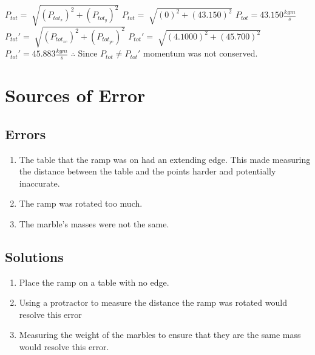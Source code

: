 \documentclass{article}
\begin{document}
$P_{tot} = \sqrt[]{{(P_{tot_{x}})}^{2} + {(P_{tot_{y}})}^{2}}$
\newline\newline
$P_{tot} = \sqrt[]{{(0)}^{2} + {(43.150)}^{2}}$
\newline\newline
$P_{tot} = 43.150\frac{kgm}{s}$
\newline\newline\newline
$P_{tot}\prime = \sqrt[]{{(P_{tot_{xc}})}^{2} + {(P_{tot_{yc}})}^{2}}$
\newline\newline
$P_{tot}\prime = \sqrt[]{{(4.1000)}^{2} + {(45.700)}^{2}}$
\newline\newline
$P_{tot}\prime = 45.883\frac{kgm}{s}$
\newline\newline\newline
$\therefore$ Since $P_{tot} \neq P_{tot}\prime$ momentum was not conserved.
\newline

\section*{Sources of Error}
\subsection*{Errors}
\begin{enumerate}
    \item {The table that the ramp was on had an extending edge. This made measuring the distance between the table and the points harder and potentially inaccurate.}
    \item {The ramp was rotated too much.}
    \item {The marble's masses were not the same.}
\end{enumerate}
\subsection*{Solutions}
\begin{enumerate}
    \item {Place the ramp on a table with no edge.}
    \item {Using a protractor to measure the distance the ramp was rotated would resolve this error}
    \item {Measuring the weight of the marbles to ensure that they are the same mass would resolve this error.}
\end{enumerate}\leavevmode
\end{document}
